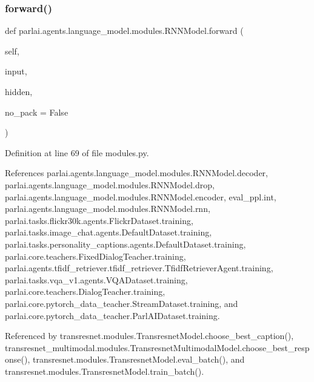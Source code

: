 \subsubsection{\texorpdfstring{forward()}{forward()}}
{\footnotesize\ttfamily def parlai.\+agents.\+language\+\_\+model.\+modules.\+R\+N\+N\+Model.\+forward (\begin{DoxyParamCaption}\item[{}]{self,  }\item[{}]{input,  }\item[{}]{hidden,  }\item[{}]{no\+\_\+pack = {\ttfamily False} }\end{DoxyParamCaption})}



Definition at line 69 of file modules.\+py.



References parlai.\+agents.\+language\+\_\+model.\+modules.\+R\+N\+N\+Model.\+decoder, parlai.\+agents.\+language\+\_\+model.\+modules.\+R\+N\+N\+Model.\+drop, parlai.\+agents.\+language\+\_\+model.\+modules.\+R\+N\+N\+Model.\+encoder, eval\+\_\+ppl.\+int, parlai.\+agents.\+language\+\_\+model.\+modules.\+R\+N\+N\+Model.\+rnn, parlai.\+tasks.\+flickr30k.\+agents.\+Flickr\+Dataset.\+training, parlai.\+tasks.\+image\+\_\+chat.\+agents.\+Default\+Dataset.\+training, parlai.\+tasks.\+personality\+\_\+captions.\+agents.\+Default\+Dataset.\+training, parlai.\+core.\+teachers.\+Fixed\+Dialog\+Teacher.\+training, parlai.\+agents.\+tfidf\+\_\+retriever.\+tfidf\+\_\+retriever.\+Tfidf\+Retriever\+Agent.\+training, parlai.\+tasks.\+vqa\+\_\+v1.\+agents.\+V\+Q\+A\+Dataset.\+training, parlai.\+core.\+teachers.\+Dialog\+Teacher.\+training, parlai.\+core.\+pytorch\+\_\+data\+\_\+teacher.\+Stream\+Dataset.\+training, and parlai.\+core.\+pytorch\+\_\+data\+\_\+teacher.\+Parl\+A\+I\+Dataset.\+training.



Referenced by transresnet.\+modules.\+Transresnet\+Model.\+choose\+\_\+best\+\_\+caption(), transresnet\+\_\+multimodal.\+modules.\+Transresnet\+Multimodal\+Model.\+choose\+\_\+best\+\_\+response(), transresnet.\+modules.\+Transresnet\+Model.\+eval\+\_\+batch(), and transresnet.\+modules.\+Transresnet\+Model.\+train\+\_\+batch().


